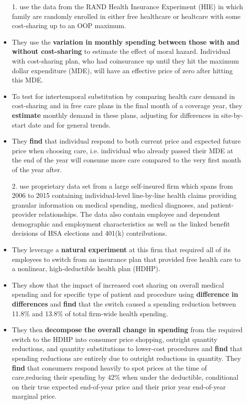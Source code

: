 \documentclass{article}
\begin{document}
\begin{itemize}
    \item[1.] \textbf{\cite{lin2019intertemporal}} use the data from the RAND Health Insurance Experiment (HIE) in which family are randomly enrolled in either free healthcare or healtcare with some cost-sharing up to an OOP maximum. 
    \item They use the \textbf{variation in monthly spending between those with and without cost-sharing} to estimate the effect of moral hazard. Individual with cost-sharing plan, who had coinsurance up until they hit the maximum dollar expenditure (MDE), will have an effective price of zero after hitting this MDE. 
    \item  To test for intertemporal substitution by comparing health care demand in cost-sharing and in free care plans in the final month of a coverage year, they \textbf{estimate} monthly demand in these plans, adjusting for differences in site-by-start date and for general trends.
    \item They \textbf{find} that individual respond to both current price and expected future price when choosing care, i.e. individual who already passed their MDE at the end of the year will consume more care compared to the very first month of the year after.
    \item[2.] \textbf{\cite{brot2017does}} use proprietary data set from a large self-insured firm which spans from 2006 to 2015 containing individual-level line-by-line health claims providing granular information on medical spending, medical diagnoses, and patient-provider relationships. The data also contain employee and dependent demographic and employment characteristics as well as the linked benefit decisions of HSA elections and 401(k) contributions. 
    \item They leverage a \textbf{natural experiment} at this firm that required all of its employees to switch from an insurance plan that provided free health care to a nonlinear, high-deductible health plan (HDHP). 
    \item They show that the impact of increased cost sharing on overall medical spending and for specific type of patient and procedure using \textbf{difference in differences} and \textbf{find} that the switch caused a spending reduction between 11.8\% and 13.8\% of total firm-wide health spending. 
    \item They then \textbf{decompose the overall change in spending} from the required switch to the HDHP into consumer price shopping, outright quantity reductions, and quantity substitutions to lower-cost procedures and \textbf{find} that spending reductions are entirely due to outright reductions in quantity. They \textbf{find} that consumers respond heavily to spot prices at the time of care,reducing their spending by 42\% when under the deductible, conditional on their true expected end-of-year price and their prior year end-of-year marginal price.
\end{itemize}
\end{document}
